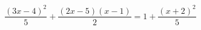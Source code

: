 \begin{ex}[type=equation]
	\begin{condition}
		\( \dfrac{(3x-4)^2}{5}+\dfrac{(2x-5)(x-1)}{2}=1+\dfrac{(x+2)^2}{5} \)
	\end{condition}
\end{ex}